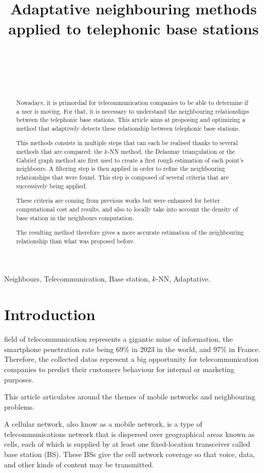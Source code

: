 \documentclass[lettersize,journal,english]{IEEEtran}
\title{Adaptative neighbouring methods applied to telephonic base stations}
\author{\IEEEauthorblockN{Paul MÉHAUD}\\
\IEEEauthorblockA{\textit{Intern at CTU in Prague} \\
\textit{INSA Rouen Normandie}\\
paul.mehaud@insa-rouen.fr}\\
\and
\IEEEauthorblockN{Brendan SÉVELLEC}\\
\IEEEauthorblockA{\textit{Intern at CTU in Prague} \\
\textit{INSA Rouen Normandie}\\
brendan.sevellec@insa-rouen.fr}}
\begin{document}
\maketitle

\begin{abstract}
    Nowadays, it is primordial for telecommunication companies to be able to determine if a user is moving. For that, it is necessary to understand the neighbouring relationships between the telephonic base stations. This article aims at proposing and optimizing a method that adaptively detects these relationship between telephonic base stations. 
    
    This methods consists in multiple steps that can each be realised thanks to several methods that are compared: the $k$-NN method, the Delaunay triangulation or the Gabriel graph method are first used to create a first rough estimation of each point's neighbours. A filtering step is then applied in order to refine the neighbouring relationships that were found. This step is composed of several criteria that are successively being applied. 
    
    These criteria are coming from previous works but were enhanced for better computational cost and results, and also to locally take into account the density of base station in the neighbours computation. 
    
    The resulting method therefore gives a more accurate estimation of the neighbouring relationship than what was proposed before.
\end{abstract}

\begin{IEEEkeywords}
    Neighbours, Telecommunication, Base station, $k$-NN, Adaptative.
\end{IEEEkeywords}
\section{Introduction}
     field of telecommunication represents a gigantic mine of information, the smartphone penetration rate being 69\% in 2023 in the world, and 97\% in France. Therefore, the collected datas represent a big opportunity for telecommunication companies to predict their customers behaviour for internal or marketing purposes. 
    
    This article articulates around the themes of mobile networks and neighbouring problems. 

    A cellular network, also know as a mobile network, is a type of telecommunications network that is dispersed over geographical areas known as cells, each of which is supplied by at least one fixed-location transceiver called base station (BS). These BSs give the cell network coverage so that voice, data, and other kinds of content may be transmitted.
    
\end{document}
